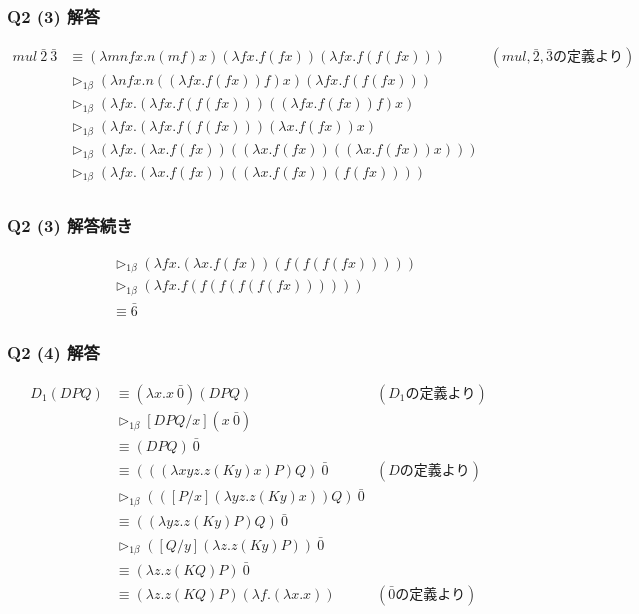 \begin{frame}
\frametitle{Q2 (3) 解答}
    \begin{align}
        mul\ \bar{2}\ \bar{3}
        &\equiv (\lambda mnfx.n(mf)x)(\lambda fx.f(fx))(\lambda fx.f(f(fx))) & (mul,\bar{2},\bar{3}の定義より)\\
        &\triangleright_{1\beta} (\lambda nfx.n((\lambda fx.f(fx))f)x)(\lambda fx.f(f(fx))) \\
        &\triangleright_{1\beta} (\lambda fx.(\lambda fx.f(f(fx)))((\lambda fx.f(fx))f)x) \\
        &\triangleright_{1\beta} (\lambda fx.(\lambda fx.f(f(fx))) (\lambda x.f(fx))x) \\
        &\triangleright_{1\beta} (\lambda fx.(\lambda x.f(fx))((\lambda x.f(fx))((\lambda x.f(fx))x))) \\
        &\triangleright_{1\beta} (\lambda fx.(\lambda x.f(fx))((\lambda x.f(fx))(f(fx)))) \\
    \end{align}
\end{frame}

\begin{frame}
\frametitle{Q2 (3) 解答続き}
    \begin{align}
        &\triangleright_{1\beta} (\lambda fx.(\lambda x.f(fx))(f(f(f(fx))))) \\
        &\triangleright_{1\beta} (\lambda fx.f(f(f(f(f(fx)))))) \\
        &\equiv \bar{6}
    \end{align}
\end{frame}

\begin{frame}
    \frametitle{Q2 (4) 解答}
    \begin{align}
        D_1(DPQ) &\equiv (\lambda x.x\ \bar{0})(DPQ) & (D_1の定義より)\\
        &\triangleright_{1\beta} [DPQ/x](x\ \bar{0}) \\
        &\equiv (DPQ)\ \bar{0} \\
        &\equiv (((\lambda xyz.z(Ky)x)P)Q)\ \bar{0} & (Dの定義より)\\
        &\triangleright_{1\beta} (([P/x](\lambda yz.z(Ky)x))Q)\ \bar{0} \\
        &\equiv ((\lambda yz.z(Ky)P)Q)\ \bar{0} \\
        &\triangleright_{1\beta} ([Q/y](\lambda z.z(Ky)P))\ \bar{0} \\
        &\equiv (\lambda z.z(KQ)P)\ \bar{0} \\
        &\equiv (\lambda z.z(KQ)P)(\lambda f.(\lambda x.x)) & (\bar{0}の定義より)\\
    \end{align}
\end{frame}

